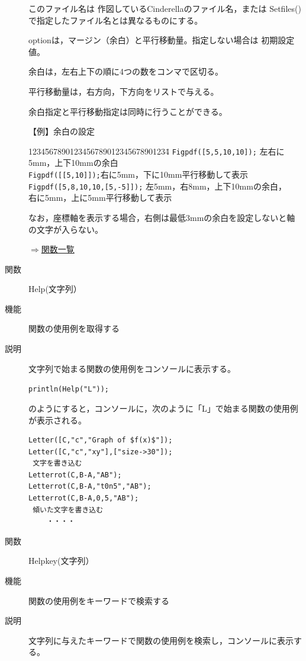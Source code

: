 \documentclass[papersize,a4paper,12pt,uplatex]{jsarticle}
\begin{document}
\begin{description}
このファイル名は 作図しているCinderellaのファイル名，または Setfiles() で指定したファイル名とは異なるものにする。

optionは，マージン（余白）と平行移動量。指定しない場合は 初期設定値。

余白は，左右上下の順に4つの数をコンマで区切る。

平行移動量は，右方向，下方向をリストで与える。

余白指定と平行移動指定は同時に行うことができる。

\vspace{\baselineskip}
【例】余白の設定
\begin{tabbing}
1234\=567890123456789012345678901234\=\kill
 \> \verb|Figpdf([5,5,10,10]);|\> 左右に5mm，上下10mmの余白\\
 \> \verb|Figpdf([[5,10]]);|\>右に5mm，下に10mm平行移動して表示\\
 \> \verb|Figpdf([5,8,10,10,[5,-5]]);| \> 左5mm，右8mm，上下10mmの余白，\\
\>\> 右に5mm，上に5mm平行移動して表示
\end{tabbing}

なお，座標軸を表示する場合，右側は最低3mmの余白を設定しないと軸の文字が入らない。

\begin{flushright}\hyperlink{functionlist}{$\Rightarrow$関数一覧}\end{flushright}

\vspace{\baselineskip}
\hypertarget{help}{}
\item[関数]Help(文字列）
\item[機能]関数の使用例を取得する
\item[説明]文字列で始まる関数の使用例をコンソールに表示する。

\hspace{10mm} \verb|println(Help("L"));|

のようにすると，コンソールに，次のように「L」で始まる関数の使用例が表示される。
\begin{verbatim}
Letter([C,"c","Graph of $f(x)$"]); 
Letter([C,"c","xy"],["size->30"]); 
 文字を書き込む 
Letterrot(C,B-A,"AB"); 
Letterrot(C,B-A,"t0n5","AB"); 
Letterrot(C,B-A,0,5,"AB"); 
 傾いた文字を書き込む 
 　　・・・・
\end{verbatim}

\vspace{\baselineskip}
\hypertarget{helpkey}{}
\item[関数]Helpkey(文字列）
\item[機能]関数の使用例をキーワードで検索する
\item[説明]文字列に与えたキーワードで関数の使用例を検索し，コンソールに表示する。


\end{description}
\end{document}
